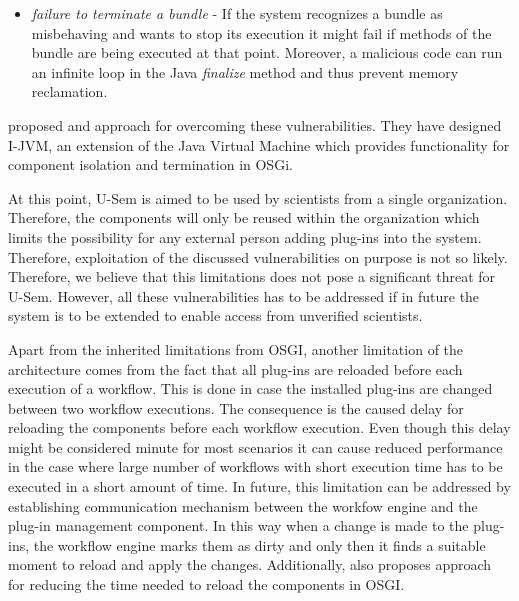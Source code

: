\begin{itemize}
\begin{itemize}
		\item \textit{failure to terminate a bundle} -  If the system recognizes a bundle as misbehaving and wants to stop its
execution it might fail if methods of the bundle are being executed at that point. Moreover, a malicious code can run an infinite loop in the Java \textit{finalize} method and thus prevent memory reclamation.
		
	\end{itemize}
	
	\cite{Geoffray} proposed and approach for overcoming these vulnerabilities. They have designed I-JVM, an extension of the Java Virtual Machine which provides functionality for component isolation and termination in OSGi.
	
\end{itemize}

At this point, U-Sem is aimed to be used by scientists from a single organization. Therefore, the components will only be reused within the organization which limits the possibility for any external person adding plug-ins into the system. Therefore, exploitation of the discussed vulnerabilities on purpose is not so likely. Therefore, we believe that this limitations does not pose a significant threat for U-Sem. However, all these vulnerabilities has to be addressed if in future the system is to be extended to enable access from unverified scientists. 

Apart from the inherited limitations from OSGI, another limitation of the architecture comes from the fact that all plug-ins are reloaded before each execution of a workflow. This is done in case the installed plug-ins are changed between two workflow executions. The consequence is the caused delay for reloading the components before each workflow execution. Even though this delay might be considered minute for most scenarios it can cause reduced performance in the case where large number of workflows with short execution time has to be executed in a short amount of time. In future, this limitation can be addressed by establishing communication mechanism between the workfow engine and the plug-in management component. In this way when a change is made to the plug-ins, the workflow engine marks them as dirty and only then it finds a suitable moment to reload and apply the changes. Additionally, \cite{Nikolov} also proposes approach for reducing the time needed to reload the components in OSGI.

